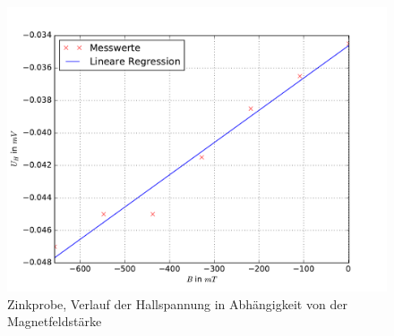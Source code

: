 \begin{figure}
  \centering
  \includegraphics[width=\textwidth]{pics/u_h_zink_konstI.pdf}
  \caption{Zinkprobe, Verlauf der Hallspannung in Abhängigkeit von der Magnetfeldstärke}
  \label{fig: uh_konstI_zink}
\end{figure}


